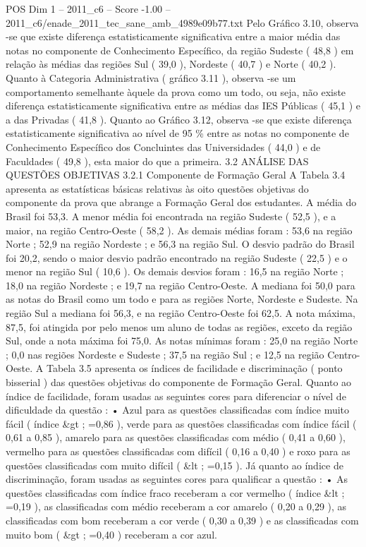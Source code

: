 \begin{textsample}{POS Dim 1 – 2011\_c6 – Score -1.00 – 2011\_c6/enade\_2011\_tec\_sane\_amb\_4989e09b77.txt}
Pelo Gráfico 3.10, observa -se que existe diferença estatisticamente significativa entre a maior média das notas no componente de Conhecimento Específico, da região Sudeste ( 48,8 ) em relação às médias das regiões Sul ( 39,0 ), Nordeste ( 40,7 ) e Norte ( 40,2 ).
Quanto à Categoria Administrativa ( gráfico 3.11 ), observa -se um comportamento semelhante àquele da prova como um todo, ou seja, não existe diferença estatisticamente significativa entre as médias das IES Públicas ( 45,1 ) e a das Privadas ( 41,8 ).
Quanto ao Gráfico 3.12, observa -se que existe diferença estatisticamente significativa ao nível de 95 \% entre as notas no componente de Conhecimento Específico dos Concluintes das Universidades ( 44,0 ) e de Faculdades ( 49,8 ), esta maior do que a primeira. 3.2 ANÁLISE DAS QUESTÕES OBJETIVAS 3.2.1 Componente de Formação Geral A Tabela 3.4 apresenta as estatísticas básicas relativas às oito questões objetivas do componente da prova que abrange a Formação Geral dos estudantes.
A média do Brasil foi 53,3.
A menor média foi encontrada na região Sudeste ( 52,5 ), e a maior, na região Centro-Oeste ( 58,2 ).
As demais médias foram : 53,6 na região Norte ; 52,9 na região Nordeste ; e 56,3 na região Sul.
O desvio padrão do Brasil foi 20,2, sendo o maior desvio padrão encontrado na região Sudeste ( 22,5 ) e o menor na região Sul ( 10,6 ).
Os demais desvios foram : 16,5 na região Norte ; 18,0 na região Nordeste ; e 19,7 na região Centro-Oeste.
A mediana foi 50,0 para as notas do Brasil como um todo e para as regiões Norte, Nordeste e Sudeste.
Na região Sul a mediana foi 56,3, e na região Centro-Oeste foi 62,5.
A nota máxima, 87,5, foi atingida por pelo menos um aluno de todas as regiões, exceto da região Sul, onde a nota máxima foi 75,0.
As notas mínimas foram : 25,0 na região Norte ; 0,0 nas regiões Nordeste e Sudeste ; 37,5 na região Sul ; e 12,5 na região Centro-Oeste.
A Tabela 3.5 apresenta os índices de facilidade e discriminação ( ponto bisserial ) das questões objetivas do componente de Formação Geral.
Quanto ao índice de facilidade, foram usadas as seguintes cores para diferenciar o nível de dificuldade da questão : • Azul para as questões classificadas com índice muito fácil ( índice \&gt ; =0,86 ), verde para as questões classificadas com índice fácil ( 0,61 a 0,85 ), amarelo para as questões classificadas com médio ( 0,41 a 0,60 ), vermelho para as questões classificadas com difícil ( 0,16 a 0,40 ) e roxo para as questões classificadas com muito difícil ( \&lt ; =0,15 ).
Já quanto ao índice de discriminação, foram usadas as seguintes cores para qualificar a questão : • As questões classificadas com índice fraco receberam a cor vermelho ( índice \&lt ; =0,19 ), as classificadas com médio receberam a cor amarelo ( 0,20 a 0,29 ), as classificadas com bom receberam a cor verde ( 0,30 a 0,39 ) e as classificadas com muito bom ( \&gt ; =0,40 ) receberam a cor azul.

\end{textsample}
